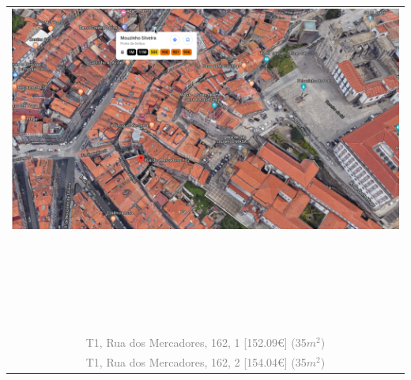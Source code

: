 \documentclass[]{report}
\begin{document}
\begin{table}[]
	\begin{center}
		\begin{huge}
			\begin{tabular}{c}
				\includegraphics[width=1\textwidth]{rua_dos_mercadores_162} \\
				~\\
				~\\
				~\\
				~\\
				~\\
				\textcolor{gray}{T1, Rua dos Mercadores, 162, 1 [152.09€] (35$m^{2}$)}\\
				\textcolor{gray}{T1, Rua dos Mercadores, 162, 2 [154.04€] (35$m^{2}$)}
			\end{tabular}
		\end{huge}
	\end{center}
\end{table}
\end{document}

